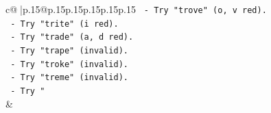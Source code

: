 \documentclass{article}
\begin{document}
{\begin{supertabular}{c@{$\;$}|p{.15\linewidth}@{}p{.15\linewidth}p{.15\linewidth}p{.15\linewidth}p{.15\linewidth}p{.15\linewidth}}
{{{\texttt{   {-} Try "trove" (o, v red).} \\
\texttt{   {-} Try "trite" (i red).} \\
\texttt{   {-} Try "trade" (a, d red).} \\
\texttt{   {-} Try "trape" (invalid).} \\
\texttt{   {-} Try "troke" (invalid).} \\
\texttt{   {-} Try "treme" (invalid).} \\
\texttt{   {-} Try "} \\
            }
        }
    }
    & \\ \\

\end{supertabular}
}
\end{document}

